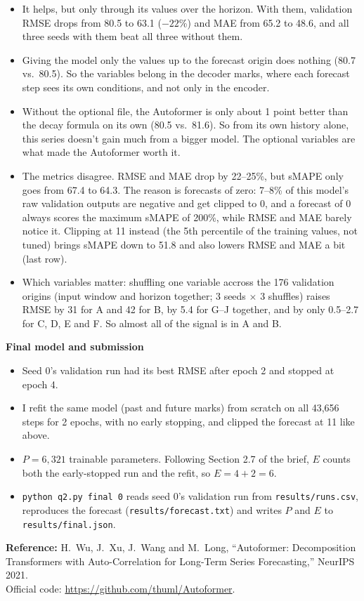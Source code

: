 \documentclass[10pt]{article}
\begin{document}
\begin{itemize}
\item It helps, but only through its values over the horizon. With them, validation RMSE drops from 80.5 to 63.1 ($-22$\%) and MAE from 65.2 to 48.6, and all three seeds with them beat all three without them.
\item Giving the model only the values up to the forecast origin does nothing (80.7 vs.\ 80.5). So the variables belong in the decoder marks, where each forecast step sees its own conditions, and not only in the encoder.
\item Without the optional file, the Autoformer is only about 1 point better than the decay formula on its own (80.5 vs.\ 81.6). So from its own history alone, this series doesn't gain much from a bigger model. The optional variables are what made the Autoformer worth it.
\item The metrics disagree. RMSE and MAE drop by 22--25\%, but sMAPE only goes from 67.4 to 64.3. The reason is forecasts of zero: 7--8\% of this model's raw validation outputs are negative and get clipped to 0, and a forecast of 0 always scores the maximum sMAPE of 200\%, while RMSE and MAE barely notice it. Clipping at 11 instead (the 5th percentile of the training values, not tuned) brings sMAPE down to 51.8 and also lowers RMSE and MAE a bit (last row).
\item Which variables matter: shuffling one variable accross the 176 validation origins (input window and horizon together; 3 seeds $\times$ 3 shuffles) raises RMSE by 31 for A and 42 for B, by 5.4 for G--J together, and by only 0.5--2.7 for C, D, E and F. So almost all of the signal is in A and B.
\end{itemize}
\textbf{Final model and submission}
\begin{itemize}
\item Seed 0's validation run had its best RMSE after epoch 2 and stopped at epoch 4.
\item I refit the same model (past and future marks) from scratch on all 43,656 steps for 2 epochs, with no early stopping, and clipped the forecast at 11 like above.
\item $P=6{,}321$ trainable parameters. Following Section 2.7 of the brief, $E$ counts both the early-stopped run and the refit, so $E=4+2=6$.
\item \texttt{python q2.py final 0} reads seed 0's validation run from \texttt{results/runs.csv}, reproduces the forecast (\texttt{results/forecast.txt}) and writes $P$ and $E$ to \texttt{results/final.json}.
\end{itemize}
\textbf{Reference:} H.~Wu, J.~Xu, J.~Wang and M.~Long, ``Autoformer: Decomposition Transformers with Auto-Correlation for Long-Term Series Forecasting,'' NeurIPS 2021.\\ Official code: \url{https://github.com/thuml/Autoformer}.
\end{document}
